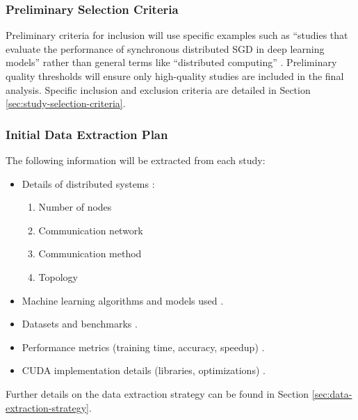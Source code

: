 \subsubsection{Preliminary Selection Criteria}
Preliminary criteria for inclusion will use specific examples such as ``studies
that evaluate the performance of synchronous distributed SGD in deep learning models'' rather than
general terms like ``distributed computing'' \cite{ben-nun_demystifying_2020}. Preliminary quality thresholds will ensure only high-quality studies are included in the final analysis. Specific inclusion and exclusion criteria are detailed in Section \ref{sec:study-selection-criteria}.

\subsubsection{Initial Data Extraction Plan}
The following information will be extracted from each study:
\begin{itemize}
    \item Details of distributed systems \cite{ben-nun_demystifying_2020,langer_distributed_2020}:
        \begin{enumerate}
            \item Number of nodes
            \item Communication network
            \item Communication method
            \item Topology
        \end{enumerate}
    \item Machine learning algorithms and models used \cite{xing_strategies_2015}.
    \item Datasets and benchmarks \cite{ben-nun_demystifying_2020}.
    \item Performance metrics (training time, accuracy, speedup) \cite{ben-nun_demystifying_2020,langer_distributed_2020,xing_strategies_2015}.
    \item CUDA implementation details (libraries, optimizations) \cite{verbraeken_survey_2021,ben-nun_demystifying_2020,xing_strategies_2015}.
\end{itemize}
Further details on the data extraction strategy can be found in Section \ref{sec:data-extraction-strategy}.

